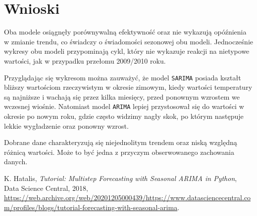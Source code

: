 \documentclass[12pt]{article}
\begin{document}
\newpage
\section{Wnioski}

Oba modele osiągnęły porównywalną efektywność oraz nie wykazują opóźnienia w zmianie trendu, co świadczy o świadomości sezonowej obu modeli. Jednocześnie wykresy obu modeli przypominają cykl, który nie wykazuje reakcji na nietypowe wartości, jak w przypadku przełomu 2009/2010 roku.

Przyglądając się wykresom można zauważyć, że model \texttt{SARIMA} posiada kształt bliższy wartościom rzeczywistym w okresie zimowym, kiedy wartości temperatury są najniższe i wachają się przez kilka miesięcy, przed ponownym wzrostem we wczesnej wiośnie. Natomiast model \texttt{ARIMA} lepiej przystosował się do wartości w okresie po nowym roku, gdzie często widzimy nagły skok, po którym następuje lekkie wygładzenie oraz ponowny wzrost.

Dobrane dane charakteryzują się niejednolitym trendem oraz niską względną różnicą wartości. Może to być jedna z przyczym obserwowanego zachowania danych.

\begin{thebibliography}{20}

     K. Hatalis, \emph{Tutorial: Multistep Forecasting with Seasonal ARIMA in Python}, Data Science Central, 2018, \url{https://web.archive.org/web/20201205000439/https://www.datasciencecentral.com/profiles/blogs/tutorial-forecasting-with-seasonal-arima}.
\end{thebibliography}
\end{document}
